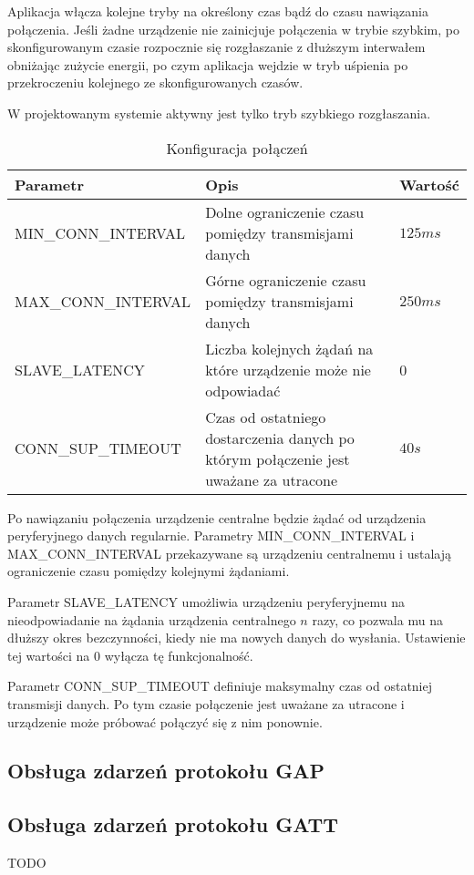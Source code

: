 Aplikacja włącza kolejne tryby na określony czas bądź do czasu nawiązania
połączenia. Jeśli żadne urządzenie nie zainicjuje połączenia w trybie szybkim,
po skonfigurowanym czasie rozpocznie się rozgłaszanie z dłuższym interwałem
obniżając zużycie energii, po czym aplikacja wejdzie w tryb uśpienia po
przekroczeniu kolejnego ze skonfigurowanych czasów.

W projektowanym systemie aktywny jest tylko tryb szybkiego rozgłaszania.

\begin{table}[t]

\begin{tabularx}{\linewidth}{|l|X|l|}

\hline Parametr & Opis & Wartość \\

\hline MIN\_CONN\_INTERVAL & Dolne ograniczenie czasu pomiędzy transmisjami
danych & $125ms$ \\

\hline MAX\_CONN\_INTERVAL & Górne ograniczenie czasu pomiędzy transmisjami
danych & $250ms$ \\

\hline SLAVE\_LATENCY & Liczba kolejnych żądań na które urządzenie może nie
odpowiadać & 0 \\

\hline CONN\_SUP\_TIMEOUT & Czas od ostatniego dostarczenia danych po którym
połączenie jest uważane za utracone & $40s$ \\

\hline \end{tabularx}

\caption{Konfiguracja połączeń}

\label{tab:parametry-polaczenia}

\end{table}

Po nawiązaniu połączenia urządzenie centralne będzie żądać od urządzenia
peryferyjnego danych regularnie. Parametry MIN\_CONN\_INTERVAL
i MAX\_CONN\_INTERVAL przekazywane są urządzeniu centralnemu i ustalają
ograniczenie czasu pomiędzy kolejnymi żądaniami.

Parametr SLAVE\_LATENCY umożliwia urządzeniu peryferyjnemu na nieodpowiadanie na
żądania urządzenia centralnego $n$ razy, co pozwala mu na dłuższy okres
bezczynności, kiedy nie ma nowych danych do wysłania. Ustawienie tej wartości na
0 wyłącza tę funkcjonalność.

Parametr CONN\_SUP\_TIMEOUT definiuje maksymalny czas od ostatniej transmisji
danych. Po tym czasie połączenie jest uważane za utracone i urządzenie może
próbować połączyć się z nim ponownie.

\subsection{Obsługa zdarzeń protokołu GAP}

\subsection{Obsługa zdarzeń protokołu GATT}

TODO
